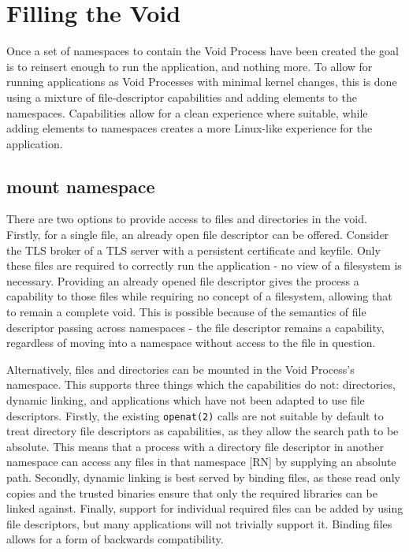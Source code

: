 \documentclass[sigplan]{acmart}
\begin{document}
\section{Filling the Void}
\label{sec:filling}

Once a set of namespaces to contain the Void Process have been created the goal is to reinsert enough to run the application, and nothing more. To allow for running applications as Void Processes with minimal kernel changes, this is done using a mixture of file-descriptor capabilities and adding elements to the namespaces. Capabilities allow for a clean experience where suitable, while adding elements to namespaces creates a more Linux-like experience for the application.

\subsection{mount namespace}
\label{sec:filling-mount}

There are two options to provide access to files and directories in the void. Firstly, for a single file, an already open file descriptor can be offered. Consider the TLS broker of a TLS server with a persistent certificate and keyfile. Only these files are required to correctly run the application - no view of a filesystem is necessary. Providing an already opened file descriptor gives the process a capability to those files while requiring no concept of a filesystem, allowing that to remain a complete void. This is possible because of the semantics of file descriptor passing across namespaces - the file descriptor remains a capability, regardless of moving into a namespace without access to the file in question.

Alternatively, files and directories can be mounted in the Void Process's namespace. This supports three things which the capabilities do not: directories, dynamic linking, and applications which have not been adapted to use file descriptors. Firstly, the existing \texttt{openat(2)} calls are not suitable by default to treat directory file descriptors as capabilities, as they allow the search path to be absolute. This means that a process with a directory file descriptor in another namespace can access any files in that namespace [RN] by supplying an absolute path. Secondly, dynamic linking is best served by binding files, as these read only copies and the trusted binaries ensure that only the required libraries can be linked against. Finally, support for individual required files can be added by using file descriptors, but many applications will not trivially support it. Binding files allows for a form of backwards compatibility.
\end{document}
